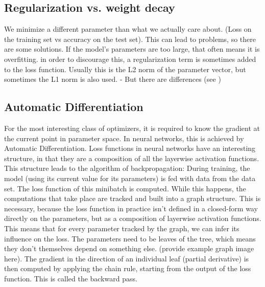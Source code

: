 \documentclass[twoside,12pt,a4paper]{report}
\begin{document}
\subsection{Regularization vs. weight decay}
We minimize a different parameter than what we actually care about. (Loss on the training set vs accuracy on the test set). This can lead to problems, so there are some solutions.
If the model's parameters are too large, that often means it is overfitting. in order to discourage this, a regularization term is sometimes added to the loss function. Usually this is the L2 norm of the parameter vector, but sometimes the L1 norm is also used.
- But there are differences (see \cite{DBLP:conf/iclr/ChaudhariCSLBBC17})

\subsection{Automatic Differentiation}
For the most interesting class of optimizers, it is required to know the gradient at the current point in parameter space. In neural networks, this is achieved by Automatic Differentiation.
Loss functions in neural networks have an interesting structure, in that they are a composition of all the layerwise activation functions. This structure leads to the algorithm of backpropagation:
During training, the model (using its current value for its parameters) is fed with data from the data set. The loss function of this minibatch is computed. While this happens, the computations that take place are tracked and built into a graph structure. This is necessary, because the loss function in practice isn't defined in a closed-form way directly on the parameters, but as a composition of layerwise activation functions. This means that for every parameter tracked by the graph, we can infer its influence on the loss. The parameters need to be leaves of the tree, which means they don't themselves depend on something else. (provide example graph image here).
The gradient in the direction of an individual leaf (partial derivative) is then computed by applying the chain rule, starting from the output of the loss function. This is called the backward pass.
\end{document}
